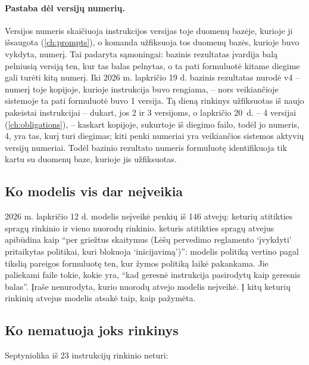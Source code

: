 \paragraph{Pastaba dėl versijų numerių.} Versijos numeris skaičiuoja instrukcijos versijas
toje duomenų bazėje, kurioje ji išsaugota (\cref{ch:prompts}), o komanda užfiksuoja tos
duomenų bazės, kurioje buvo vykdyta, numerį. Tai padaryta sąmoningai: bazinis rezultatas
įvardija balą pelniusią versiją ten, kur tas balas pelnytas, o ta pati formuluotė kitame
diegime gali turėti kitą numerį. Iki 2026 m. lapkričio 19 d. bazinis rezultatas nurodė
 v4 -- numerį toje kopijoje, kurioje instrukcija buvo rengiama, -- nors
veikiančioje sistemoje ta pati formuluotė buvo 1 versija. Tą dieną rinkinys užfiksuotas iš naujo
pakeistai instrukcijai -- dukart, jos 2 ir 3 versijoms, o lapkričio 20~d. -- 4 versijai
(\cref{ch:obligations}), -- kaskart kopijoje, sukurtoje iš diegimo failo, todėl jo numeris,
4, yra tas, kurį turi diegimas; kiti penki numeriai yra veikiančios sistemos aktyvių
versijų numeriai. Todėl bazinio rezultato numeris formuluotę identifikuoja tik kartu su
duomenų baze, kurioje jis užfiksuotas.

\subsection{Ko modelis vis dar neįveikia}\label{sec:control:misses}

2026 m. lapkričio 12 d. modelis neįveikė penkių iš 146 atvejų: keturių atitikties spragų
rinkinio ir vieno nuorodų rinkinio.  keturis atitikties spragų
atvejus apibūdina kaip \enquote{per griežtus skaitymus (Lėšų pervedimo reglamento
\enquote{įvykdyti} pritaikytas politikai, kuri blokuoja \enquote{inicijavimą})}: modelis
politiką vertino pagal tikslią pareigos formuluotę ten, kur žymos politiką laikė pakankama.
Jie paliekami faile tokie, kokie yra, \enquote{kad geresnė instrukcija pasirodytų kaip
geresnis balas}. Įraše nenurodyta, kurio nuorodų atvejo modelis neįveikė. Į kitų keturių
rinkinių atvejus modelis atsakė taip, kaip pažymėta.

\subsection{Ko nematuoja joks rinkinys}\label{sec:control:unmeasured}

Septyniolika iš 23 instrukcijų rinkinio neturi:

